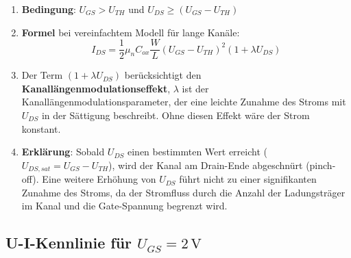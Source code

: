 \documentclass{scrarticle}
\numberwithin{equation}{section}
\begin{document}
\begin{enumerate}
	\renewcommand{\labelenumi}{} %
	\item \textbf{Bedingung}: $U_{GS} > U_{TH}$ und $U_{DS} \ge (U_{GS} - U_{TH})$
	\item \textbf{Formel} bei vereinfachtem Modell für lange Kanäle:
	\begin{equation*}
		I_{DS} = \frac{1}{2} \mu_n C_{ox} \frac{W}{L} (U_{GS} - U_{TH})^2 \left( 1 + \lambda U_{DS} \right)
	\end{equation*}
		\item Der Term $(1 + \lambda U_{DS})$ berücksichtigt den \textbf{Kanallängenmodulationseffekt}, $\lambda$ ist der Kanallängenmodulationsparameter, der eine leichte Zunahme des Stroms mit $U_{DS}$ in der Sättigung beschreibt. Ohne diesen Effekt wäre der Strom konstant.
	\item \textbf{Erklärung}: Sobald $U_{DS}$ einen bestimmten Wert erreicht ($U_{DS,sat} = U_{GS} - U_{TH}$), wird der Kanal am Drain-Ende abgeschnürt (pinch-off). Eine weitere Erhöhung von $U_{DS}$ führt nicht zu einer signifikanten Zunahme des Stroms, da der Stromfluss durch die Anzahl der Ladungsträger im Kanal und die Gate-Spannung begrenzt wird.
\end{enumerate}

\subsection{U-I-Kennlinie für $U_{GS} = 2\,\mathrm{V}$}
\end{document}
